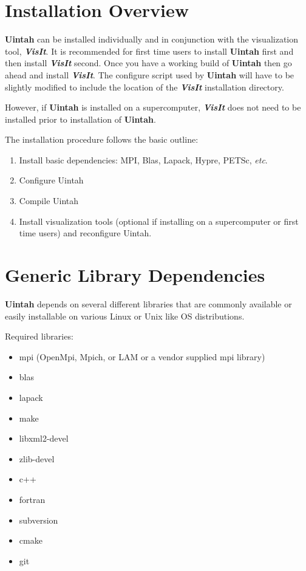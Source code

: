 \documentclass[11pt,fleqn]{book} %
\begin{document}
\chapter{Installation Overview}

\textbf{Uintah} can be installed individually and in conjunction with
the visualization tool, \textbf{\emph{VisIt}}.  It is recommended for
first time users to install \textbf{Uintah} first and then install
\textbf{\emph{VisIt}} second. Once you have a working build of
\textbf{Uintah} then go ahead and install \textbf{\emph{VisIt}}.  The
configure script used by \textbf{Uintah} will have to be slightly
modified to include the location of the \textbf{\emph{VisIt}}
installation directory.  

However, if \textbf{Uintah} is installed on a supercomputer,
\textbf{\emph{VisIt}} does not need to be installed prior to
installation of \textbf{Uintah}.

The installation procedure follows the basic outline:

\begin{enumerate}

\item Install basic dependencies: MPI, Blas, Lapack, Hypre, PETSc, \emph{etc}.

\item Configure Uintah

\item Compile Uintah

\item Install visualization tools (optional if installing on a
  supercomputer or first time users) and reconfigure Uintah.


\end{enumerate}



\chapter{Generic Library Dependencies}

\textbf{Uintah} depends on several different libraries that are
commonly available or easily installable on various Linux or Unix like
OS distributions.

Required libraries:
\begin{itemize}
\item mpi (OpenMpi, Mpich, or LAM or a vendor supplied mpi library)
\item blas
\item lapack
\item make
\item libxml2-devel
\item zlib-devel
\item c++
\item fortran
\item subversion
\item cmake
\item git

\end{itemize}
\end{document}
